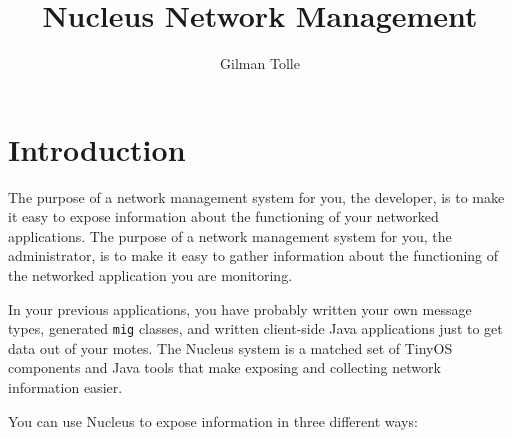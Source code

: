 \documentclass{article}
\begin{document}
\title{Nucleus Network Management}
\author{Gilman Tolle}

\maketitle

\tableofcontents
\newpage

\section{Introduction}

The purpose of a network management system for you, the developer, is
to make it easy to expose information about the functioning of your
networked applications. The purpose of a network management system for
you, the administrator, is to make it easy to gather information about
the functioning of the networked application you are monitoring. 

In your previous applications, you have probably written your own
message types, generated {\tt mig} classes, and written client-side
Java applications just to get data out of your motes. The Nucleus
system is a matched set of TinyOS components and Java tools that make
exposing and collecting network information easier.

You can use Nucleus to expose information in three different ways:
\end{document}
